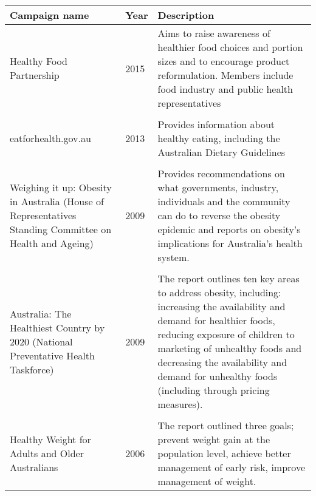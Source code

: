 \bgroup
\def\rowSpace{-2pt}
\begin{tabularx}{\columnwidth}{p{2.9cm}l>{\arraybackslash}X}
\toprule
{\textbf{Campaign name}} & \textbf{Year} & \textbf{Description} \\ 
\midrule
{Healthy Food \mbox{Partnership}} & 2015 & Aims to raise awareness of healthier food choices and portion sizes and to encourage product reformulation. Members include food industry and public health representatives \\ \relax \null & & \\[\rowSpace]
{eatforhealth.gov.au} & 2013 & Provides information about healthy eating, including the Australian Dietary Guidelines \\ \relax \null & & \\[\rowSpace]
{Weighing it up: Obesity in Australia (House of Representatives Standing Committee on Health and Ageing)} & 2009 & Provides recommendations on what governments, industry, individuals and the community can do to reverse the obesity epidemic and reports on obesity's implications for Australia's health system. \\ \relax \null & & \\[\rowSpace] 
{Australia: The Healthiest Country by 2020 (National Preventative Health Taskforce)} & 2009 & The report outlines ten key areas to address obesity, including: increasing the availability and demand for healthier foods, reducing exposure of children to marketing of unhealthy foods and decreasing the availability and demand for unhealthy foods (including through pricing measures). \\ \relax \null & & \\[\rowSpace]
{Healthy Weight for Adults and Older Australians} & 2006 & The report outlined three goals; prevent weight gain at the population level, achieve better management of early risk, improve management of weight. \\ 
\bottomrule
\end{tabularx}
\egroup